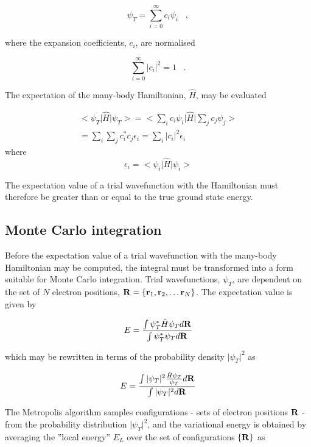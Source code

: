 \documentclass{article}
\begin{document}
\begin{equation}
 \psi_T=\sum_{i=0}^{\infty} c_{i} \psi_i \;\;\;,
\end{equation}

where the expansion coefficients, $c_{i}$, are normalised 

\begin{equation}
\sum_{i=0}^{\infty} \vert c_{i}\vert^2=1 \;\;\;.
\end{equation}

The expectation of the many-body Hamiltonian, $\hat{H}$, may be evaluated 

\begin{align}
 <\psi_T\vert\hat{H}\vert\psi_T >  = <\sum_i c_i\psi_i\vert\hat{H}\vert\sum_j c_j\psi_j > \\
 = \sum_i \sum_j c_{i}^{*} c_{j} \epsilon_{i} = \sum_i \vert c_{i}\vert^{2} \epsilon_{i}
\end{align}
where 
\begin{equation}
 \epsilon_{i} = <\psi_i\vert\hat{H}\vert\psi_i >
\end{equation}

The expectation value of a trial wavefunction with the Hamiltonian must therefore be greater than or equal to the true ground state energy.

\subsection{Monte Carlo integration}
Before the expectation value of a trial wavefunction with the many-body Hamiltonian may be computed, the integral must be transformed into a form suitable for Monte Carlo integration. Trial wavefunctions, $\psi_T$, are dependent on the set of $N$ electron positions,  ${\bf R}=\{{\bf r}_1,{\bf r}_2, \ldots {\bf r}_N\}$. The expectation value is given by

\begin{equation}
E=\frac{\int \psi_{T}^{*}\hat{H}\psi_{T} d{\bf R}}
{\int \psi_{T}^{*}\psi_{T}d{\bf R}}
\end{equation}

which may be rewritten in terms of the probability density  $\vert\psi_{T}\vert^{2}$ as

\begin{equation}
E=\frac{\int \vert\psi_{T}\vert^{2}\frac{\hat{H}\psi_{T}}{\psi_{T}} d{\bf R}}
{\int \vert\psi_{T}\vert^{2}d{\bf R}}
\end{equation}

The Metropolis algorithm samples configurations - sets of electron positions ${\bf R}$ - from the probability distribution  $\vert\psi_{T}\vert^{2}$, and the variational energy is obtained by averaging the ''local energy'' $E_{L}$ over the set of configurations $\{{\bf R}\}$ as 
\end{document}
